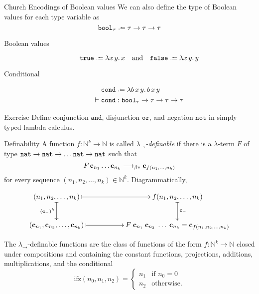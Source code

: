 \begin{frame}{Church Encodings of Boolean values}
We can also define the type of Boolean values 
for each type variable as
\[
  \bool_\tau \defeq \tau \to \tau \to \tau
\]
\begin{description}
  \item[Boolean values]
      \[
        \true \defeq \lambda x\,y.\,x 
        \quad\text{and}\quad
        \false \defeq \lambda x\,y.\,y 
      \]
  \item[Conditional]
    \begin{align*}
      & \cond \defeq \lambda b\,x\,y.\, b\,x\,y\\
      \vdash {} & \cond : \bool_{\tau} \to \tau \to \tau \to \tau
    \end{align*}
\end{description}
\begin{block}{Exercise}
  Define conjunction $\mathtt{and}$, disjunction $\mathtt{or}$, and negation
  $\mathtt{not}$ in simply typed lambda calculus.
\end{block}
\end{frame}

\begin{frame}[allowframebreaks]{Definability}
  A function $f\colon \mathbb{N}^k \to \mathbb{N}$ is called
  \alert{\emph{$\lambda_\to$-definable}} if there is a $\lambda$-term $F$ of
  type $\mathtt{nat} \to \mathtt{nat} \to \dots \mathtt{nat} \to \mathtt{nat}$ such that
  \[
    F\,\mathbf{c}_{n_1}\ldots\mathbf{c}_{n_k} \longrightarrow_{\beta*} \mathbf{c}_{f(n_1, \dots, n_k)}
  \]
  for every sequence $(n_1, n_2, \ldots, n_k) \in \mathbb{N}^k$.
  Diagrammatically, 

\[
  \xymatrix{
    (n_1, n_2, \ldots, n_k) \ar@{|->}[rr] \ar@{|->}[d]_{(\bc_{-})^k} & & f(n_1,
    n_2, \ldots, n_k) \ar@{|->}[d]^{\bc_{-}}\\
    (\bc_{n_1}, \bc_{n_2}, \ldots, \bc_{n_k}) \ar@{|->}[rr] & & 
    F\;\bc_{n_1}\; \bc_{n_2}\; \ldots\;\bc_{n_k}
    = \bc_{f(n_1, n_2, \ldots, n_k)}
  }
\]
\begin{theorem}
  The $\lambda_\to$-definable functions are the class of functions
  of the form $f\colon \mathbb{N}^k \to \mathbb{N}$ closed under compositions
  and containing the constant functions, projections, additions, multiplications,
  and the conditional 
  \[
    \mathrm{ifz}(n_0, n_1, n_2) = 
    \begin{cases}
      n_1 & \text{if } n_0 = 0\\
      n_2 & \text{otherwise.}
    \end{cases}
  \]
\end{theorem}
\end{frame}

